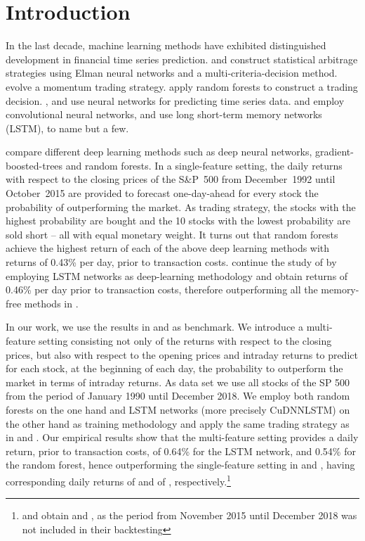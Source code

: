 \documentclass[review]{elsarticle}
\begin{document}
\section{Introduction} 




In the last decade, machine learning methods have exhibited distinguished development in financial time series prediction. 
\cite{huck2009pairs} and \cite{huck2010pairs} construct statistical arbitrage strategies using Elman neural networks and a multi-criteria-decision method.
\cite{takeuchi2013} evolve a momentum trading strategy.
\cite{moritz2014deep} apply random forests to construct a trading decision.
\cite{tran2018}, and \cite{sezer2018} use neural networks for predicting time series data.
\cite{borovykh2018} and \cite{xue2018} employ convolutional neural networks, 
and \cite{siami2018} use long short-term memory networks (LSTM),
to name but a few.

\cite{krauss17}  compare different deep learning methods such as deep neural networks, gradient-boosted-trees and random forests. In a single-feature setting, the daily returns with respect to the closing prices of the S\&P~500
 from December~1992 until October~2015 
are provided to forecast one-day-ahead for every stock the probability of outperforming the market. As trading strategy, the  stocks with the highest probability are bought and the 10 stocks with the lowest probability are sold short -- all with equal monetary weight.  It turns out that random forests achieve the highest return of each of the above deep learning methods with returns of 0.43\% per day, prior to transaction costs. \cite{krauss18} continue the study of \cite{krauss17} by employing LSTM networks as deep-learning  methodology and obtain returns of 0.46\% per day prior to transaction costs, therefore outperforming all the memory-free methods in \cite{krauss17}.

In our work, we use the results in \cite{krauss17} and \cite{krauss18} as benchmark. We introduce a multi-feature setting consisting not only of the returns with respect to the closing prices, but also with respect to the opening prices and intraday returns to predict for each stock, at the beginning of each day, the probability to outperform  the market in terms of intraday returns. As data set we use all stocks of the SP 500 from the period of January 1990 until December 2018.
We employ both random forests on the one hand and LSTM networks (more precisely CuDNNLSTM) on the other hand as training methodology and apply the same trading strategy as in  \cite{krauss17} and \cite{krauss18}. Our empirical results show that the multi-feature setting provides a daily return, prior to transaction costs, of 0.64\% for the LSTM network, and 0.54\% for the random forest, hence outperforming the single-feature setting in \cite{krauss18} and \cite{krauss17}, having corresponding daily returns of   and of , respectively.\footnote{\cite{krauss18} and  \cite{krauss17} obtain  and , as the period from November 2015 until December 2018 was not included in their backtesting}
\end{document}
